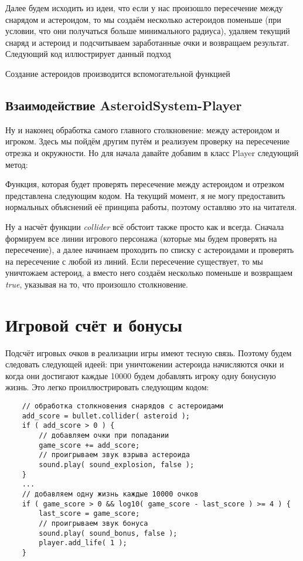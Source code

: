 Далее будем исходить из идеи, что если у нас произошло пересечение между снарядом и 
астероидом, то мы создаём несколько астероидов поменьше (при условии, что они 
получаться больше минимального радиуса), удаляем текущий снаряд и астероид и 
подсчитываем заработанные очки и возвращаем результат. Следующий код иллюстрирует 
данный подход


Создание астероидов производится вспомогательной функцией


\subsection{Взаимодействие AsteroidSystem-Player}
Ну и наконец обработка самого главного столкновение: между астероидом и игроком. 
Здесь мы пойдём другим путём и реализуем проверку на пересечение отрезка и окружности.
Но для начала давайте добавим в класс Player следующий метод:


Функция, которая будет проверять пересечение между астероидом и отрезком представлена 
следующим кодом. На текущий момент, я не могу предоставить нормальных объяснений её 
принципа работы, поэтому оставляю это на читателя.


Ну а насчёт функции \emph{collider} всё обстоит также просто как и всегда. Сначала 
формируем все линии игрового персонажа (которые мы будем проверять на пересечение), а 
далее начинаем проходить по списку с астероидами и проверять на пересечение с любой из 
линий. Если пересечение существует, то мы уничтожаем астероид, а вместо него создаём 
несколько поменьше и возвращаем \emph{true}, указывая на то, что произошло столкновение.


\newpage

\section{Игровой счёт и бонусы}
Подсчёт игровых очков в реализации игры имеют тесную связь. Поэтому будем следовать 
следующей идеей: при уничтожении астероида начисляются очки и когда они достигают 
каждые 10000 будем добавлять игроку одну бонусную жизнь. Это легко проиллюстрировать 
следующим кодом:
\begin{lstlisting}
    // обработка столкновения снарядов с астероидами
    add_score = bullet.collider( asteroid );
    if ( add_score > 0 ) {
        // добавляем очки при попадании
        game_score += add_score;
        // проигрываем звук взрыва астероида
        sound.play( sound_explosion, false );
    }
    ...
    // добавляем одну жизнь каждые 10000 очков
    if ( game_score > 0 && log10( game_score - last_score ) >= 4 ) {
        last_score = game_score;
        // проигрываем звук бонуса
        sound.play( sound_bonus, false );
        player.add_life( 1 );
    }
\end{lstlisting}

